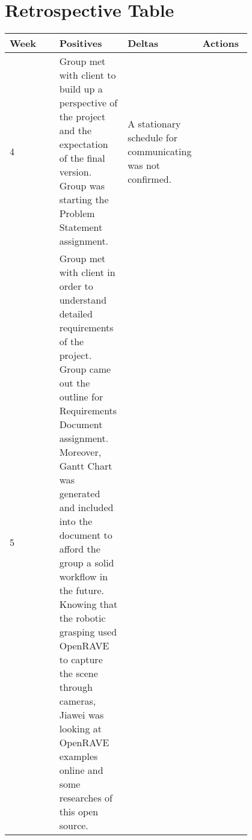 \documentclass[10pt,journal,compsoc, draftclsnofoot,onecolumn]{IEEEtran}
\begin{document}




\section{Retrospective Table}
\begin{center}
 \begin{tabular}{|p{0.2\linewidth}|p{0.2\linewidth}|p{0.2\linewidth}|p{0.2\linewidth}|}
  \hline
 Week & Positives & Deltas & Actions \\ [0.5ex]
 \hline\hline
 

4
&
Group met with client to build up a perspective of the project and the expectation of the final version.
Group was starting the Problem Statement assignment.
&
A stationary schedule for communicating was not confirmed.
&

\\ \hline

5
&
Group met with client in order to understand detailed requirements of the project.
Group came out the outline for Requirements Document assignment.
Moreover, Gantt Chart was generated and included into the document to afford the group a solid workflow in the future.
Knowing that the robotic grasping used OpenRAVE to capture the scene through cameras, Jiawei was looking at OpenRAVE examples online and some researches of this open source. 
&

&

\\ \hline
 \end{tabular}
\end{center}
\end{document}
